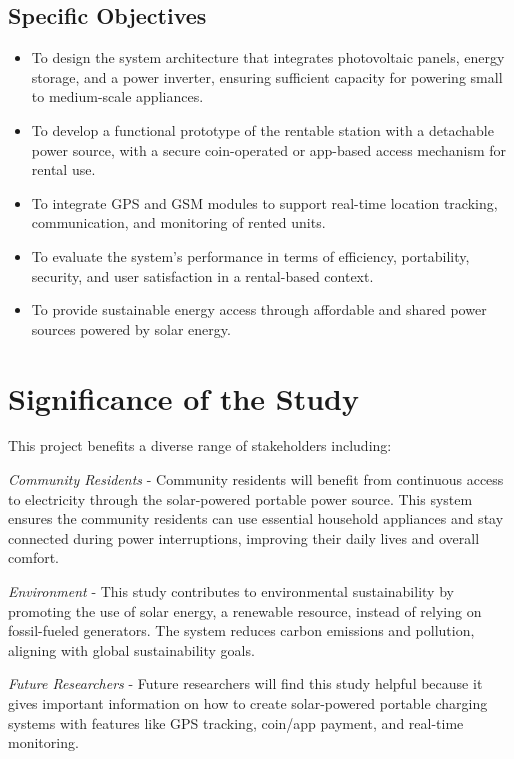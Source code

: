 {\subsection{Specific Objectives}
\begin{itemize}
	\item To design the system architecture that integrates photovoltaic panels, energy storage, and a power inverter, ensuring sufficient capacity for powering small to medium-scale appliances.
	\item To develop a functional prototype of the rentable station with a detachable power source, with a secure coin-operated or app-based access mechanism for rental use.
	\item To integrate GPS and GSM modules to support real-time location tracking, communication, and monitoring of rented units.
	\item To evaluate the system’s performance in terms of efficiency, portability, security, and user satisfaction in a rental-based context.
	\item To provide sustainable energy access through affordable and shared power sources powered by solar energy.
\end{itemize}

\section{Significance of the Study}

This project benefits a diverse range of stakeholders including: 

\textit{Community Residents} - Community residents will benefit from continuous access to electricity through the solar-powered portable power source. This system ensures the community residents can use essential household appliances and stay connected during power interruptions, improving their daily lives and overall comfort.

\textit{Environment} - This study contributes to environmental sustainability by promoting the use of solar energy, a renewable resource, instead of relying on fossil-fueled generators. The system reduces carbon emissions and pollution, aligning with global sustainability goals.

\textit{Future Researchers} - Future researchers will find this study helpful because it gives important information on how to create solar-powered portable charging systems with features like GPS tracking, coin/app payment, and real-time monitoring. 

}
